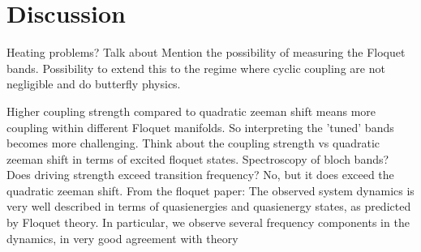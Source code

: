 \section{Discussion}

Heating problems? Talk about  Mention the possibility of measuring the Floquet bands. Possibility to extend this to the regime where cyclic coupling are not negligible and do butterfly physics.


Higher coupling strength compared to quadratic zeeman shift means more coupling within different Floquet manifolds. So interpreting the 'tuned' bands becomes more challenging.
Think about the coupling strength vs quadratic zeeman shift in terms of excited floquet states. 
Spectroscopy of bloch bands?
Does driving strength exceed transition frequency? No, but it does exceed the quadratic zeeman shift. 
From the floquet paper: The observed  system dynamics is very well described in terms of
quasienergies and quasienergy states, as predicted by
Floquet theory. In particular, we observe several frequency
components in the dynamics, in very good agreement with
theory